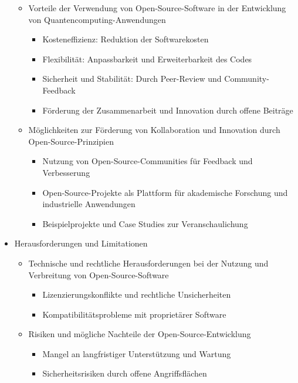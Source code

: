 \begin{itemize}
\begin{itemize}
            \item Vorteile der Verwendung von Open-Source-Software in der Entwicklung von Quantencomputing-Anwendungen
                \begin{itemize}
                    \item Kosteneffizienz: Reduktion der Softwarekosten
                    \item Flexibilität: Anpassbarkeit und Erweiterbarkeit des Codes
                    \item Sicherheit und Stabilität: Durch Peer-Review und Community-Feedback
                    \item Förderung der Zusammenarbeit und Innovation durch offene Beiträge
                \end{itemize}
            \item Möglichkeiten zur Förderung von Kollaboration und Innovation durch Open-Source-Prinzipien
                \begin{itemize}
                    \item Nutzung von Open-Source-Communities für Feedback und Verbesserung
                    \item Open-Source-Projekte als Plattform für akademische Forschung und industrielle Anwendungen
                    \item Beispielprojekte und Case Studies zur Veranschaulichung
                \end{itemize}
        \end{itemize}
    \item Herausforderungen und Limitationen
        \begin{itemize}
            \item Technische und rechtliche Herausforderungen bei der Nutzung und Verbreitung von Open-Source-Software
                \begin{itemize}
                    \item Lizenzierungskonflikte und rechtliche Unsicherheiten
                    \item Kompatibilitätsprobleme mit proprietärer Software
                \end{itemize}
            \item Risiken und mögliche Nachteile der Open-Source-Entwicklung
                \begin{itemize}
                    \item Mangel an langfristiger Unterstützung und Wartung
                    \item Sicherheitsrisiken durch offene Angriffsflächen

\end{itemize}
\end{itemize}
\end{itemize}
